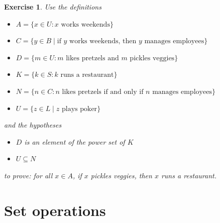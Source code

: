 \documentclass{book}
\newcounter{ekcounter}%
\theoremstyle{ekimcustom}
\newtheorem{exercise}[ekcounter]{Exercise}
\begin{document}
\begin{exercise}
Use the definitions
\begin{itemize}
\item $A = \{x \in U : x \text{ works weekends}\}$
\item $C = \{y \in B \mid \text{if } y \text{ works weekends, then } y \text{ manages employees}\}$
\item $D = \{m \in U : m \text{ likes pretzels and } m \text{ pickles veggies}\}$
\item $K = \{k \in S : k \text{ runs a restaurant}\}$
\item $N = \{n \in C : n \text{ likes pretzels if and only if } n \text{ manages employees}\}$
\item $U = \{z \in L \mid z \text{ plays poker}\}$
\end{itemize}
and the hypotheses
\begin{itemize}
\item $D$ is an element of the power set of $K$
\item $U \subseteq N$
\end{itemize}
to prove: for all $x \in A$, if $x$ pickles veggies, then $x$ runs a restaurant.
\end{exercise}

\section{Set operations}
\end{document}

